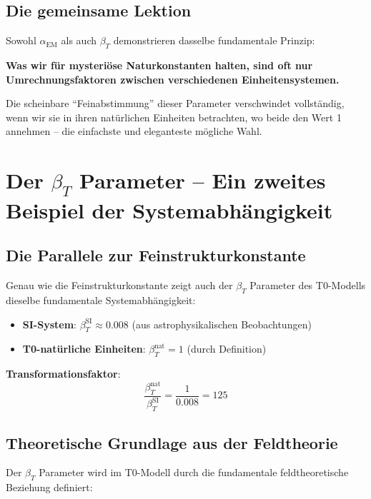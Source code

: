 \documentclass[12pt,a4paper]{article}
\begin{document}
\subsection{Die gemeinsame Lektion}
\label{subsec:common_lesson}

Sowohl $\alpha_{\text{EM}}$ als auch $\beta_T$ demonstrieren dasselbe fundamentale Prinzip:

\textbf{Was wir für mysteriöse Naturkonstanten halten, sind oft nur Umrechnungsfaktoren zwischen verschiedenen Einheitensystemen.}

Die scheinbare ``Feinabstimmung'' dieser Parameter verschwindet vollständig, wenn wir sie in ihren natürlichen Einheiten betrachten, wo beide den Wert 1 annehmen -- die einfachste und eleganteste mögliche Wahl.
\section{Der $\beta_T$ Parameter -- Ein zweites Beispiel der Systemabhängigkeit}
\label{sec:beta_t}

\subsection{Die Parallele zur Feinstrukturkonstante}
\label{subsec:beta_parallel}

Genau wie die Feinstrukturkonstante zeigt auch der $\beta_T$ Parameter des T0-Modells dieselbe fundamentale Systemabhängigkeit:

\begin{itemize}
	\item \textbf{SI-System}: $\beta_T^{\text{SI}} \approx 0.008$ (aus astrophysikalischen Beobachtungen)
	\item \textbf{T0-natürliche Einheiten}: $\beta_T^{\text{nat}} = 1$ (durch Definition)
\end{itemize}

\textbf{Transformationsfaktor}: 
\begin{equation}
	\frac{\beta_T^{\text{nat}}}{\beta_T^{\text{SI}}} = \frac{1}{0.008} = 125
\end{equation}

\subsection{Theoretische Grundlage aus der Feldtheorie}
\label{subsec:beta_field_theory}

Der $\beta_T$ Parameter wird im T0-Modell durch die fundamentale feldtheoretische Beziehung definiert:
\end{document}
